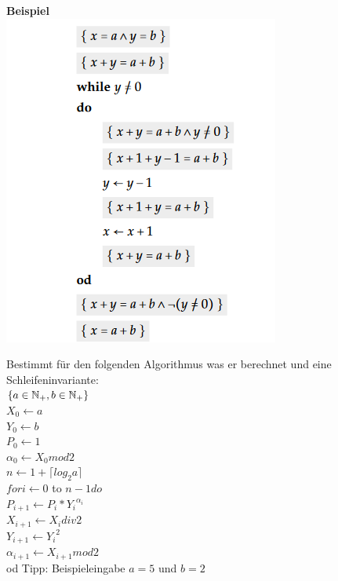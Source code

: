 \documentclass[handout]{beamer}
\begin{document}
\begin{frame}
	\textbf{Beispiel}\\
	\includegraphics[scale=0.7]{images/do_od_loes.png}
\end{frame}

\begin{frame}
    Bestimmt für den folgenden Algorithmus was er berechnet und eine 
Schleifeninvariante: \\
$\{a \in \mathbb{N}_+, b \in \mathbb{N}_+\}$ \\
$X_0 \leftarrow a$ \\
$Y_0 \leftarrow b $\\
$P_0 \leftarrow 1 $\\
$\alpha_0 \leftarrow X_0 mod  2$ \\
$n \leftarrow 1 + \lceil log_2 a \rceil $\\
$for i \leftarrow 0$ to $n-1 do $ \\
\hspace{5mm}
$P_{i+1} \leftarrow P_i * {Y_i}^{\alpha_i}$ \\
\hspace{5mm}
$X_{i+1} \leftarrow X_i div 2$ \\
\hspace{5mm}
$Y_{i+1} \leftarrow {Y_i}^2$ \\
\hspace{5mm}
$\alpha_{i+1} \leftarrow X_{i+1} mod 2$ \\
od 
\newline \newline
Tipp: Beispieleingabe $a = 5$ und $b = 2$
\end{frame}



\end{document}
